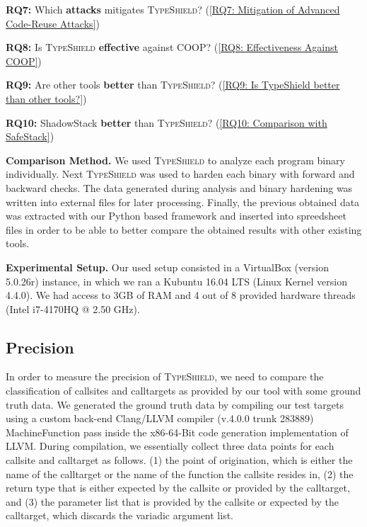   \textbf{RQ7:} Which \textbf{attacks} mitigates \textsc{TypeShield}? (\cref{RQ7: Mitigation of Advanced Code-Reuse Attacks})\vspace{-.05cm}
  
 \textbf{RQ8:} Is \textsc{TypeShield} \textbf{effective} against COOP? (\cref{RQ8: Effectiveness Against COOP})\vspace{-.05cm}
  
 \textbf{RQ9:} Are other tools \textbf{better} than \textsc{TypeShield}? (\cref{RQ9: Is TypeShield better than other tools?})\vspace{-.05cm}
 
 \textbf{RQ10:} ShadowStack \textbf{better} than \textsc{TypeShield}? (\cref{RQ10: Comparison with SafeStack})\vspace{-.05cm}
  


\textbf{Comparison Method.} We used \textsc{TypeShield} to analyze each program binary individually. Next \textsc{TypeShield} was used to harden each binary with forward and 
backward checks. The data generated during analysis and binary hardening was written into external files for later processing. Finally, the previous obtained 
data was extracted with our Python based framework and inserted into spreedsheet files in order to be able to better compare the obtained 
results with other existing tools.

\textbf{Experimental Setup.} Our used setup consisted in a VirtualBox (version 5.0.26r) instance, in which we ran a Kubuntu 16.04 LTS (Linux Kernel
version 4.4.0). We had access to 3GB of RAM and 4 out of 8 provided hardware threads (Intel i7-4170HQ @ 2.50 GHz).

\subsection{Precision}
\label{section:typeshieldprecision}

In order to measure the precision of \textsc{TypeShield}, we need to compare the classification of callsites and calltargets as provided by our tool with 
some ground truth data. We generated the ground truth data by compiling our test targets using a 
custom back-end Clang/LLVM compiler (v.4.0.0 trunk 283889) MachineFunction pass inside the x86-64-Bit code generation implementation of LLVM. 
During compilation, we essentially collect three data points for each callsite and calltarget as follows.
(1) the point of origination, which is either the name of the calltarget or the name of the function the callsite resides in, 
(2) the return type that is either expected by the callsite or provided by the calltarget, and 
(3) the parameter list that is provided by the callsite or expected by the calltarget, which discards the variadic argument list.


